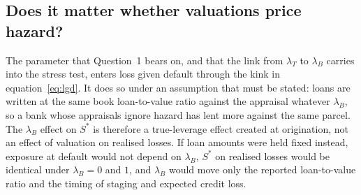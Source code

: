 \subsection{Does it matter whether valuations price hazard?}

\begin{table}[t]
\centering\footnotesize
\caption{Loss given default and the breaking point under valuations that ignore or price hazard}\label{tab:lambda}

\end{table}

The parameter that Question~1 bears on, and that the link from $\lambda_T$ to $\lambda_B$ carries into the stress test, enters loss given default through the kink in equation~\eqref{eq:lgd}. It does so under an assumption that must be stated: loans are written at the same book loan-to-value ratio against the appraisal whatever $\lambda_B$, so a bank whose appraisals ignore hazard has lent more against the same parcel. The $\lambda_B$ effect on $S^*$ is therefore a true-leverage effect created at origination, not an effect of valuation on realised losses. If loan amounts were held fixed instead, exposure at default would not depend on $\lambda_B$, $S^*$ on realised losses would be identical under $\lambda_B = 0$ and $1$, and $\lambda_B$ would move only the reported loan-to-value ratio and the timing of staging and expected credit loss.

